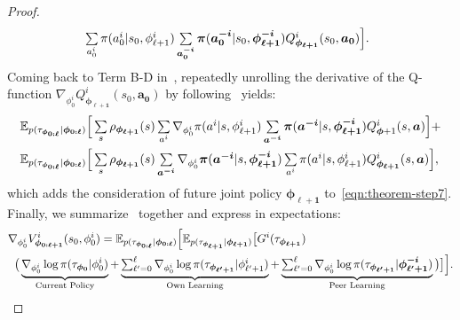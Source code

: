 \begin{proof}
\begin{align}
\begin{split}
&\;\textstyle\sum\limits_{a^{i}_{0}}\pi(a^{i}_{0}|s_0,\phi^{i}_{\ell+1})\textstyle\sum\limits_{\bm{a}^{\bm{-i}}_{\bm{0}}}\bm{\pi}(\bm{a}^{\bm{-i}}_{\bm{0}}|s_{0},\bm{\phi}^{\bm{-i}}_{\bm{\ell+1}}) Q^{i}_{\bm{\phi}_{\bm{\ell+1}}}(s_{0},\bm{a}_{\bm{0}})
\Big].
\end{split}
\end{align}
Coming back to Term B-D in~, repeatedly unrolling the derivative of the Q-function $\nabla_{\phi^{i}_{0}}Q^{i}_{\bm{\phi}_{\bm{\ell+1}}}(s_{0},\bm{a}_{\bm{0}})$ by following~\citet{Sutton:1998} yields:
\begin{align}\label{eqn:theorem-step8}
\begin{split}
&
\mathbb{E}_{{p(\tau_{\bm{\phi}_{\bm{0:\ell}}}}|\bm{\phi}_{\bm{0:\ell}})}\Big[\textstyle\sum\limits_{s}\rho_{\bm{\phi}_{\bm{\ell+1}}}(s)\textstyle\sum\limits_{a^{i}}\nabla_{\phi^{i}_{0}}\pi(a^{i}|s,\phi^{i}_{\ell+1})\textstyle\sum\limits_{\bm{a}^{\bm{-i}}}\bm{\pi}(\bm{a}^{\bm{-i}}|s,\bm{\phi}^{\bm{-i}}_{\bm{\ell+1}})Q^{i}_{\bm{\phi}+1}(s,\bm{a})\Big]+\\
&
\mathbb{E}_{{p(\tau_{\bm{\phi}_{\bm{0:\ell}}}|\bm{\phi}_{\bm{0:\ell}})}}
\Big[\textstyle\sum\limits_{s}\rho_{\bm{\phi}_{\bm{\ell+1}}}(s)\textstyle\sum\limits_{\bm{a}^{\bm{-i}}}\nabla_{\phi^{i}_{0}}\bm{\pi}(\bm{a}^{\bm{-i}}|s,\bm{\phi}^{\bm{-i}}_{\bm{\ell+1}})\textstyle\sum\limits_{a^{i}}\pi(a^{i}|s,\phi^{i}_{\ell+1})Q^{i}_{\bm{\phi}_{\bm{\ell+1}}}(s,\bm{a})\Big],
\end{split}
\end{align}
which adds the consideration of future joint policy $\bm{\phi}_{\bm{\ell+1}}$ to~\cref{eqn:theorem-step7}.
Finally, we summarize~ together and express in expectations:
\begin{align*}
\begin{split}
&\nabla_{\phi^{i}_{0}}V^{i}_{\bm{\phi}_{\bm{0:\ell+1}}}(s_0,\phi^{i}_{0})=\mathbb{E}_{p(\tau_{\bm{\phi}_{\bm{0:\ell}}}|\bm{\phi}_{\bm{0:\ell}})}\Big[\mathbb{E}_{p(\tau_{\bm{\phi}_{\bm{\ell+1}}}|\bm{\phi}_{\bm{\ell+1}})}\big[G^{i}(\tau_{\bm{\phi}_{\bm{\ell+1}}})\\
&\;\;\big(\underbrace{\nabla_{\phi^{i}_{0}}\log\pi(\tau_{\bm{\phi}_{\bm{0}}}|\phi^{i}_{0})}_{\text{Current Policy}}+\underbrace{\textstyle\sum\limits\nolimits_{\ell'=0}^{\ell}\nabla_{\phi^{i}_{0}}\log\pi(\tau_{\bm{\phi}_{\bm{\ell'+1}}}|\phi^{i}_{\ell'+1})}_{\text{Own Learning}}+\underbrace{\textstyle\sum\limits\nolimits_{\ell'=0}^{\ell}\nabla_{\phi^{i}_{0}}\log\pi(\tau_{\bm{\phi}_{\bm{\ell'+1}}}|\bm{\phi}^{\bm{-i}}_{\bm{\ell'+1}})}_{\text{Peer Learning}}\big)\big]\Big].
\end{split}
\end{align*}
\end{proof}

